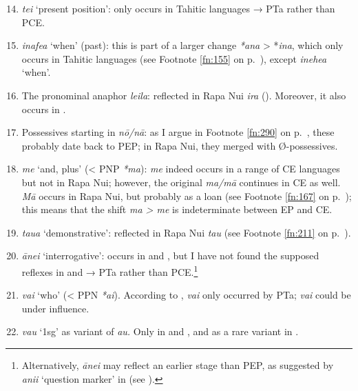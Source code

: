 \begin{enumerate}
\setcounter{enumi}{13}
\item 
\textit{tei} ‘present position’: only occurs in Tahitic languages → PTa rather than PCE.   

\item 
\textit{inafea} ‘when’ (past): this is part of a larger change \textit{*ana} {\textgreater} *\textit{ina}, which only occurs in Tahitic languages (see Footnote \ref{fn:155} on p.~\pageref{fn:155}), except  \textit{inehea} ‘when’.   

\item 
The pronominal anaphor \textit{leila}: reflected in Rapa Nui \textit{ira} (). Moreover, it also occurs in  \citep[45]{Pawley1966}.   

\item 
Possessives starting in \textit{nō/nā}: as I argue in Footnote \ref{fn:290} on p.~\pageref{fn:290}, these probably date back to PEP; in Rapa Nui, they merged with Ø-possessives.   

\item 
\textit{me} ‘and, plus’ ({\textless} PNP \textit{*ma}): \textit{me} indeed occurs in a range of CE languages but not in Rapa Nui; however, the original \textit{ma/mā} continues in CE as well. \textit{Mā} occurs in Rapa Nui, but probably as a  loan (see Footnote \ref{fn:167} on p.~\pageref{fn:167}); this means that the shift \textit{ma {\textgreater} me} is indeterminate between EP and CE.   

\item 
\textit{taua} ‘demonstrative’: reflected in Rapa Nui \textit{tau} (see Footnote \ref{fn:211} on p.~\pageref{fn:211}).  

\item 
\textit{ānei} ‘interrogative’: occurs in  and , but I have not found the supposed reflexes in  and  → PTa rather than PCE.\footnote{\label{fn:15}Alternatively, \textit{ānei} may reflect an earlier stage than PEP, as suggested by \textit{anii} ‘question marker’ in  (see \citealt[23]{Moyle2011}).}   

\item 
\textit{vai} ‘who’ ({\textless} PPN \textit{*ai}). According to \citet[300]{Wilson2012}, \textit{vai} only occurred by PTa;  \textit{vai} could be under  influence.   

\item 
\textit{vau} ‘1sg’ as variant of \textit{au.} Only in  and , and as a rare variant in .   

\end{enumerate}

